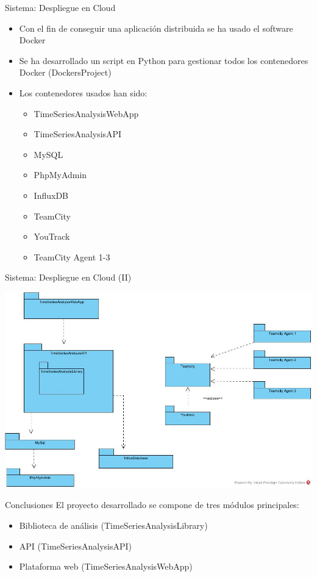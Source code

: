 \begin{tframe}{Sistema: Despliegue en Cloud}
	\begin{itemize}
		\item<+-| alert@+> Con el fin de conseguir una aplicación distribuida se ha usado el software Docker
		\item<+-| alert@+> Se ha desarrollado un script en Python para gestionar todos los contenedores Docker (DockersProject)
		\item<+-> Los contenedores usados han sido:
		\begin{itemize}
			\item TimeSeriesAnalysisWebApp
			\item TimeSeriesAnalysisAPI
			\item MySQL
			\item PhpMyAdmin
			\item InfluxDB
			\item TeamCity
			\item YouTrack
			\item TeamCity Agent 1-3
		\end{itemize}
	\end{itemize}
\end{tframe}

\begin{tframe}{Sistema: Despliegue en Cloud (II)}
	\begin{center}
		\includegraphics[scale=0.28]{images/DockerContainers}
	\end{center}
\end{tframe}

\begin{tframe}{Conclusiones}
	El proyecto desarrollado se compone de tres módulos principales:
	\begin{itemize}
		\item<+-| alert@+> Biblioteca de análisis (TimeSeriesAnalysisLibrary)
		\item<+-| alert@+> API (TimeSeriesAnalysisAPI)
		\item<+-| alert@+> Plataforma web (TimeSeriesAnalysisWebApp)
	\end{itemize}
\end{tframe}

